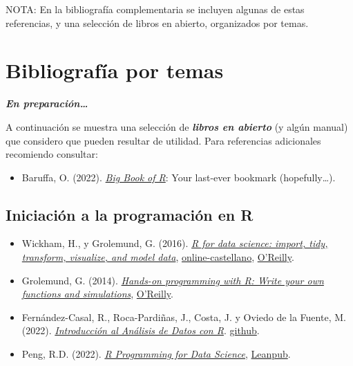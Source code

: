 \documentclass[
]{book}
\providecommand{\tightlist}{%
  \setlength{\itemsep}{0pt}\setlength{\parskip}{0pt}}
\theoremstyle{break}
\theoremstyle{nonumberplain}
\begin{document}
NOTA: En la bibliografía complementaria se incluyen algunas de estas referencias, y una selección de libros en abierto, organizados por temas.

\hypertarget{bibliografuxeda-por-temas}{%
\section*{Bibliografía por temas}\label{bibliografuxeda-por-temas}}

\textbf{\emph{En preparación\ldots{}}}

A continuación se muestra una selección de \textbf{\emph{libros en abierto}} (y algún manual) que considero que pueden resultar de utilidad.
Para referencias adicionales recomiendo consultar:

\begin{itemize}
\tightlist
\item
  Baruffa, O. (2022). \emph{\href{https://www.bigbookofr.com}{Big Book of R}}: Your last-ever bookmark (hopefully\ldots).
\end{itemize}

\hypertarget{iniciaciuxf3n-a-la-programaciuxf3n-en-r}{%
\subsection*{Iniciación a la programación en R}\label{iniciaciuxf3n-a-la-programaciuxf3n-en-r}}

\begin{itemize}
\item
  Wickham, H., y Grolemund, G. (2016). \emph{\href{http://r4ds.had.co.nz}{R for data science: import, tidy, transform, visualize, and model data}}, \href{https://es.r4ds.hadley.nz}{online-castellano}, \href{http://shop.oreilly.com/product/0636920034407.do}{O'Reilly}.
\item
  Grolemund, G. (2014). \emph{\href{https://rstudio-education.github.io/hopr}{Hands-on programming with R: Write your own functions and simulations}}, \href{http://shop.oreilly.com/product/0636920028574.do}{O'Reilly}.
\item
  Fernández-Casal, R., Roca-Pardiñas, J., Costa, J. y Oviedo de la Fuente, M. (2022). \emph{\href{https://rubenfcasal.github.io/intror}{Introducción al Análisis de Datos con R}}. \href{https://github.com/rubenfcasal/intror}{github}.
\item
  Peng, R.D. (2022). \emph{\href{https://bookdown.org/rdpeng/rprogdatascience}{R Programming for Data Science}}, \href{https://leanpub.com/rprogramming}{Leanpub}.
\end{itemize}
\end{document}
